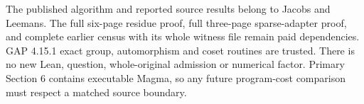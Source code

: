 \documentclass[11pt,a4paper]{article}
\begin{document}
The published algorithm and reported source results belong to Jacobs and
Leemans. The full six-page residue proof, full three-page sparse-adapter
proof, and complete earlier census with its whole witness file remain
paid dependencies. GAP 4.15.1 exact group, automorphism and coset routines
are trusted. There is no new Lean, question, whole-original admission or
numerical factor. Primary Section 6 contains executable Magma, so any
future program-cost comparison must respect a matched source boundary.
\end{document}
